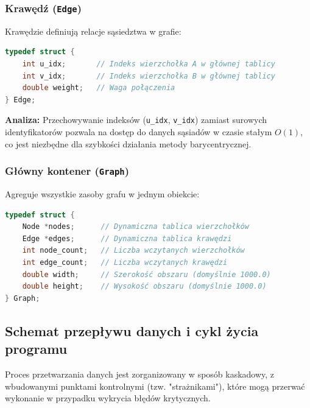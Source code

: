 \documentclass[12pt,a4paper]{article}
\begin{document}
\subsubsection{Krawędź (\texttt{Edge})}
Krawędzie definiują relacje sąsiedztwa w grafie:
\begin{lstlisting}[language=C, caption={Struktura krawędzi w graph.h}]
typedef struct {
    int u_idx;       // Indeks wierzchołka A w głównej tablicy
    int v_idx;       // Indeks wierzchołka B w głównej tablicy
    double weight;   // Waga połączenia
} Edge;
\end{lstlisting}
\textbf{Analiza:} Przechowywanie indeksów (\texttt{u\_idx}, \texttt{v\_idx}) zamiast surowych identyfikatorów pozwala na dostęp do danych sąsiadów w czasie stałym $O(1)$, co jest niezbędne dla szybkości działania metody barycentrycznej.

\subsubsection{Główny kontener (\texttt{Graph})}
Agreguje wszystkie zasoby grafu w jednym obiekcie:
\begin{lstlisting}[language=C, caption={Struktura grafu w graph.h}]
typedef struct {
    Node *nodes;      // Dynamiczna tablica wierzchołków
    Edge *edges;      // Dynamiczna tablica krawędzi
    int node_count;   // Liczba wczytanych wierzchołków
    int edge_count;   // Liczba wczytanych krawędzi
    double width;     // Szerokość obszaru (domyślnie 1000.0)
    double height;    // Wysokość obszaru (domyślnie 1000.0)
} Graph;
\end{lstlisting}
\newpage
\subsection{Schemat przepływu danych i cykl życia programu}
Proces przetwarzania danych jest zorganizowany w sposób kaskadowy, z wbudowanymi punktami kontrolnymi (tzw. "strażnikami"), które mogą przerwać wykonanie w przypadku wykrycia błędów krytycznych.
\end{document}
